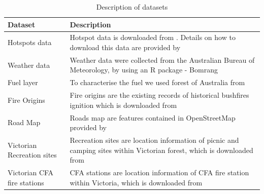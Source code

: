 \documentclass[11pt,a4paper,]{article}
\begin{document}
\begin{table}

\caption{\label{tab:datadescription}Description of datasets}
\centering
\begin{tabular}[t]{l|>{\raggedright\arraybackslash}p{30em}}
\hline
Dataset & Description\\
\hline
Hotspots data & Hotspot data is downloaded from \textcite{jaxa}. Details on how to download this data are provided by \textcite{hotspots}\\
\hline
Weather data & Weather data were collected from the Australian Bureau of Meteorology, by using an R package - Bomrang \parencite{R-bomrang}\\
\hline
Fuel layer & To characterise the fuel we used forest of Australia from \textcite{forest}\\
\hline
Fire Origins & Fire origins are the existing records of historical bushfires ignition which is downloaded from \textcite{fireorigin}\\
\hline
Road Map & Roads map are features contained in OpenStreetMap provided by \textcite{OpenStreetMap}\\
\hline
Victorian Recreation sites & Recreation sites are location information of picnic and camping sites within Victorian forest, which is downloaded from \textcite{recreation}\\
\hline
Victorian CFA fire stations & CFA stations are location information of CFA fire station within Victoria, which is downloaded from \textcite{cfa}\\
\hline
\end{tabular}
\end{table}
\end{document}
